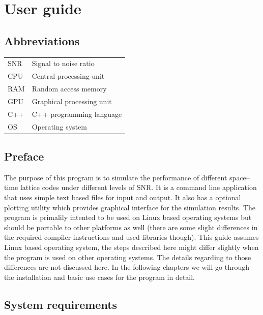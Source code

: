 \documentclass[english,12pt,a4paper,pdftex,sci,utf8]{aaltothesis}
\begin{document}
\clearpage

\thesisappendix

\section{User guide}

\subsection{Abbreviations}
\begin{tabular}{ll}
SNR & Signal to noise ratio \\
CPU & Central processing unit \\
RAM & Random access memory \\
GPU & Graphical processing unit \\
C++ & C++ programming language \\
OS & Operating system \\
\end{tabular}



\subsection{Preface}
The purpose of this program is to simulate the performance of different space--time lattice codes under different levels of SNR. It is a command line application that uses simple text based files for input and output. It also has a optional plotting utility which provides graphical interface for the simulation results. The program is primalily intented to be used on Linux based operating systems but should be portable to other platforms as well (there are some slight differences in the required compiler instructions and used libraries though). This guide assumes Linux based operating system, the steps described here might differ slightly when the program is used on other operating systems. The details regarding to those differences are not discussed here. In the following chapters we will go through the installation and basic use cases for the program in detail. 

\subsection{System requirements}
\end{document}
